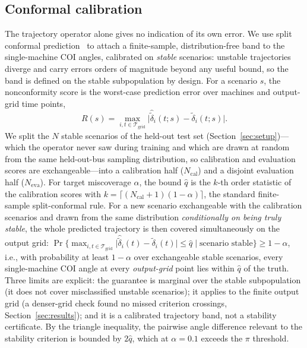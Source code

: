 \documentclass[5p,times]{elsarticle}
\begin{document}
\subsection{Conformal calibration}
The trajectory operator alone gives no indication of its own error. We use split conformal
prediction~\cite{lei2018distribution} to attach a finite-sample, distribution-free band to the
single-machine COI angles, calibrated on \emph{stable} scenarios: unstable trajectories diverge
and carry errors orders of magnitude beyond any useful bound, so the band is defined on the stable
subpopulation by design. For a scenario $s$, the nonconformity score is the worst-case prediction error over
machines and output-grid time points,
\begin{equation}
R(s) = \max_{i,t\in\mathcal{T}_{\mathrm{grid}}} \bigl| \hat{\tilde\delta}_i(t;s) - \tilde\delta_i(t;s) \bigr| .
\end{equation}
We split the $N$ stable scenarios of the held-out test set (Section~\ref{sec:setup})---which the
operator never saw during training and which are drawn at random from the same held-out-bus
sampling distribution, so calibration and evaluation scores are exchangeable---into a calibration
half ($N_{\mathrm{cal}}$) and a disjoint evaluation half ($N_{\mathrm{eva}}$). For target
miscoverage $\alpha$, the bound $\hat q$ is the $k$-th order statistic of the calibration scores
with $k=\lceil(N_{\mathrm{cal}}+1)(1-\alpha)\rceil$, the standard finite-sample split-conformal
rule. For a new scenario exchangeable with the calibration scenarios and drawn from the same
distribution \emph{conditionally on being truly stable}, the whole predicted trajectory is then
covered simultaneously on the output grid: $\Pr\{ \max_{i,t\in\mathcal{T}_{\mathrm{grid}}}
\bigl| \hat{\tilde\delta}_i(t) - \tilde\delta_i(t) \bigr| \le \hat q \mid \text{scenario stable} \}
\ge 1-\alpha$, i.e., with probability at least $1-\alpha$ over exchangeable stable scenarios,
every single-machine COI angle at every \emph{output-grid} point lies within $\hat q$ of the
truth. Three limits are
explicit: the guarantee is marginal over the stable subpopulation (it does not cover misclassified
unstable scenarios); it applies to the finite output grid (a denser-grid check found no missed
criterion crossings, Section~\ref{sec:results}); and it is a calibrated trajectory band, not a
stability certificate. By the triangle inequality, the pairwise angle difference relevant to the
stability criterion is bounded by $2\hat q$, which at $\alpha{=}0.1$ exceeds the $\pi$ threshold.
\end{document}
